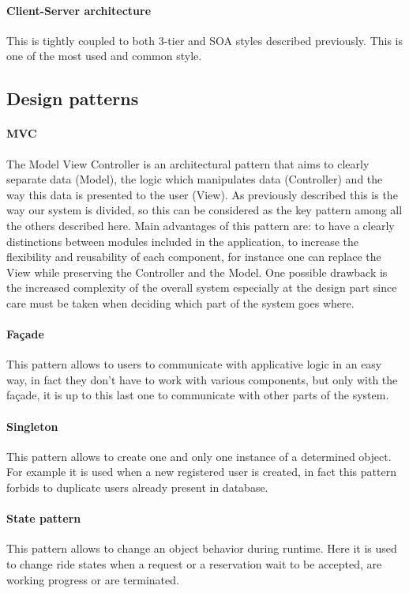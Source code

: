 \paragraph{Client-Server architecture}
This is tightly coupled to both 3-tier and SOA styles described previously. This is one of the most used and common style.
\subsection{Design patterns}
\paragraph{MVC}
The Model View Controller is an architectural pattern that aims to clearly separate  data (Model), the logic which manipulates data (Controller) and the way this data is presented to the user (View). As previously described this is the way our system is divided, so this can be considered as the key pattern among all the others described here. Main advantages of this pattern are: to have a clearly distinctions between modules included in the application, to increase the flexibility and reusability of each component, for instance one can replace the View while preserving the Controller and the Model. One possible drawback is the increased complexity of the overall system especially at the design part since care must be taken when deciding which part of the system goes where.
\paragraph{Fa\c{c}ade}
This pattern allows to users to communicate with applicative logic in an easy way, in fact they don't have to work with various components, but only with the fa\c{c}ade, it is up to this last one to communicate with other parts of the system.
\paragraph{Singleton}
This pattern allows to create one and only one instance of a determined object. For example it is used when a new registered user is created, in fact this pattern forbids to duplicate users already present in database. 
\paragraph{State pattern}
This pattern allows to change an object behavior during runtime. Here it is used to change ride states when a request or a reservation wait to be accepted, are working progress or are terminated.
